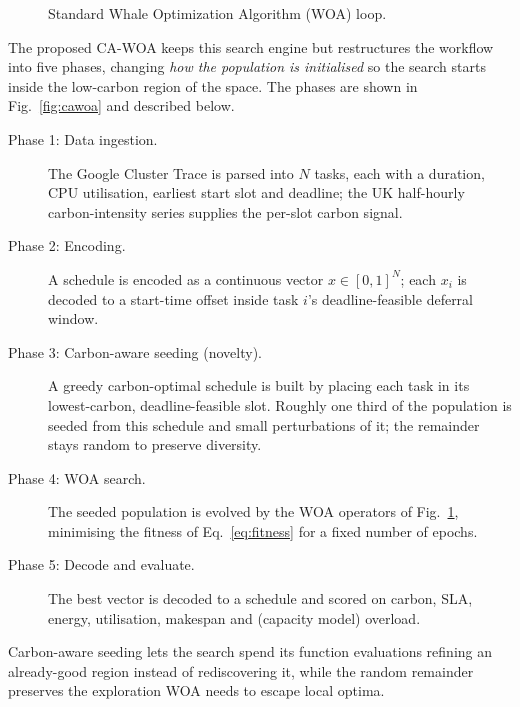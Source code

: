 \documentclass[12pt,a4paper]{article}
\begin{document}
\begin{figure}[H]\centering
{}
\caption{Standard Whale Optimization Algorithm (WOA) loop.}\label{fig:woa}
\end{figure}

The proposed CA-WOA keeps this search engine but restructures the workflow into five phases, changing
\emph{how the population is initialised} so the search starts inside the low-carbon region of the space.
The phases are shown in Fig.~\ref{fig:cawoa} and described below.

\begin{description}
\item[Phase 1: Data ingestion.] The Google Cluster Trace is parsed into $N$ tasks, each with a
duration, CPU utilisation, earliest start slot and deadline; the UK half-hourly carbon-intensity series
supplies the per-slot carbon signal.
\item[Phase 2: Encoding.] A schedule is encoded as a continuous vector $x\in[0,1]^N$; each $x_i$ is
decoded to a start-time offset inside task $i$'s deadline-feasible deferral window.
\item[Phase 3: Carbon-aware seeding (novelty).] A greedy carbon-optimal schedule is built by placing
each task in its lowest-carbon, deadline-feasible slot. Roughly one third of the population is seeded
from this schedule and small perturbations of it; the remainder stays random to preserve diversity.
\item[Phase 4: WOA search.] The seeded population is evolved by the WOA operators of
Fig.~\ref{fig:woa}, minimising the fitness of Eq.~\eqref{eq:fitness} for a fixed number of epochs.
\item[Phase 5: Decode and evaluate.] The best vector is decoded to a schedule and scored on carbon,
SLA, energy, utilisation, makespan and (capacity model) overload.
\end{description}
Carbon-aware seeding lets the search spend its function evaluations refining an already-good region
instead of rediscovering it, while the random remainder preserves the exploration WOA needs to escape
local optima.
\end{document}
